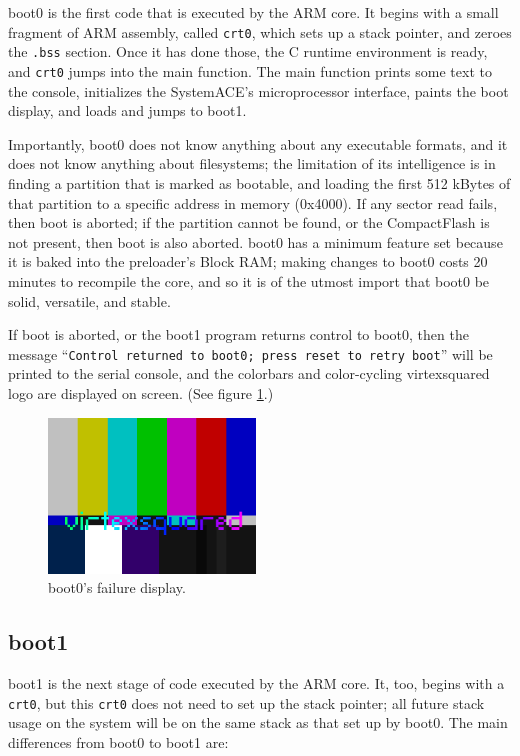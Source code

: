 \documentclass[10pt]{article}
\begin{document}
boot0 is the first code that is executed by the ARM core. It begins with a
small fragment of ARM assembly, called \texttt{crt0}, which sets up a stack
pointer, and zeroes the \texttt{.bss} section.  Once it has done those, the
C runtime environment is ready, and \texttt{crt0} jumps into the main
function.  The main function prints some text to the console, initializes
the SystemACE's microprocessor interface, paints the boot display, and loads
and jumps to boot1.

Importantly, boot0 does not know anything about any executable formats, and
it does not know anything about filesystems; the limitation of its
intelligence is in finding a partition that is marked as bootable, and
loading the first 512 kBytes of that partition to a specific address in
memory (0x4000). If any sector read fails, then boot is aborted; if the
partition cannot be found, or the CompactFlash is not present, then boot is
also aborted. boot0 has a minimum feature set because it is baked into the
preloader's Block RAM; making changes to boot0 costs 20 minutes to recompile
the core, and so it is of the utmost import that boot0 be solid, versatile,
and stable.

If boot is aborted, or the boot1 program returns control to boot0, then the
message ``\texttt{Control returned to boot0; press reset to retry boot}'' will
be printed to the serial console, and the colorbars and color-cycling
virtexsquared logo are displayed on screen.  (See figure \ref{img:boot0}.)

\begin{figure}
  \centering
    \includegraphics[width=0.49\textwidth]{boot0.png}
  \caption{boot0's failure display.} \label{img:boot0}
\end{figure}

\subsection{boot1}

boot1 is the next stage of code executed by the ARM core. It, too, begins
with a \texttt{crt0}, but this \texttt{crt0} does not need to set up the
stack pointer; all future stack usage on the system will be on the same
stack as that set up by boot0.  The main differences from boot0 to boot1
are:
\end{document}
